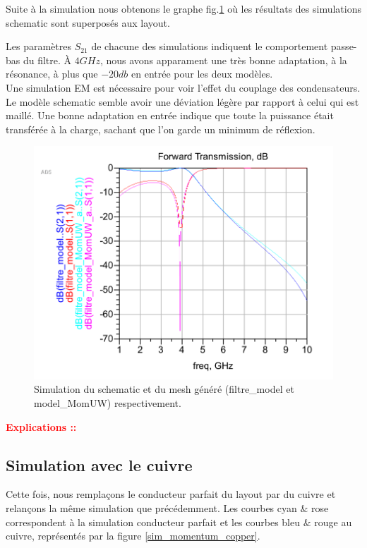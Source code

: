 \documentclass[a4paper]{article}
\begin{document}
Suite \`a la simulation nous obtenons le graphe fig.\ref{sim_schematic_momentum} o\`u les r\'esultats des simulations
schematic sont superpos\'es aux layout.


Les param\`etres $S_{21}$ de chacune des simulations indiquent le comportement passe-bas du filtre. \`A $4 GHz$,
nous avons apparament une tr\`es bonne adaptation, \`a la r\'esonance, \`a plus que $-20 db$ en entr\'ee pour les deux mod\`eles.
\\
Une simulation EM est n\'ecessaire pour voir l'effet du couplage des condensateurs.\\

Le mod\`ele schematic semble avoir une d\'eviation l\'eg\`ere par rapport \`a celui qui est maill\'e.
Une bonne adaptation en entr\'ee indique que toute la puissance \'etait transf\'er\'ee \`a la charge, sachant que l'on garde
un minimum de r\'eflexion.

\clearpage

\begin{figure}[!htb]
\begin{center}
  \includegraphics[scale=0.35]{schematic_mesh.png}
  \caption{Simulation du schematic et du mesh g\'en\'er\'e (filtre\_model et model\_MomUW) respectivement.}
  \label{sim_schematic_momentum}
\end{center}
\end{figure}

\textbf{\textcolor{red}{Explications ::}}

\subsection{Simulation avec le cuivre}
Cette fois, nous rempla\c cons le conducteur parfait du layout par du cuivre et relan\c cons la m\^eme simulation que pr\'ec\'edemment.
Les courbes cyan $\&$ rose correspondent \`a la simulation conducteur parfait et les courbes bleu $\&$ rouge au cuivre, repr\'esent\'es
par la figure \ref{sim_momentum_copper}.
\end{document}

